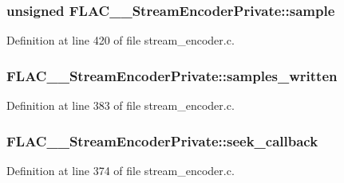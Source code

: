\subsubsection[{\texorpdfstring{sample}{sample}}]{\setlength{\rightskip}{0pt plus 5cm}unsigned F\+L\+A\+C\+\_\+\+\_\+\+Stream\+Encoder\+Private\+::sample}\hypertarget{struct_f_l_a_c_____stream_encoder_private_aaa58a90dcc7dff79e03e86a51e855966}{}\label{struct_f_l_a_c_____stream_encoder_private_aaa58a90dcc7dff79e03e86a51e855966}


Definition at line 420 of file stream\+\_\+encoder.\+c.

\subsubsection[{\texorpdfstring{samples\+\_\+written}{samples_written}}]{ F\+L\+A\+C\+\_\+\+\_\+\+Stream\+Encoder\+Private\+::samples\+\_\+written}\hypertarget{struct_f_l_a_c_____stream_encoder_private_a2e54ad1e501e2595a840c6a6f1f72774}{}\label{struct_f_l_a_c_____stream_encoder_private_a2e54ad1e501e2595a840c6a6f1f72774}


Definition at line 383 of file stream\+\_\+encoder.\+c.

\subsubsection[{\texorpdfstring{seek\+\_\+callback}{seek_callback}}]{ F\+L\+A\+C\+\_\+\+\_\+\+Stream\+Encoder\+Private\+::seek\+\_\+callback}\hypertarget{struct_f_l_a_c_____stream_encoder_private_ae2d302c3de63f9387544eb69c85d9e2b}{}\label{struct_f_l_a_c_____stream_encoder_private_ae2d302c3de63f9387544eb69c85d9e2b}


Definition at line 374 of file stream\+\_\+encoder.\+c.


